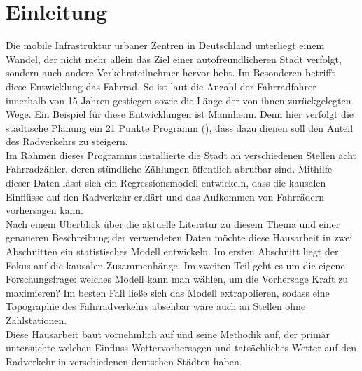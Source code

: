 \documentclass[a4paper,12pt]{thesis}
\begin{document}
\begingroup
\let\clearpage\relax
\listoffigures
\listoftables
\endgroup






\chapter{Einleitung}

Die mobile Infrastruktur urbaner Zentren in Deutschland unterliegt einem Wandel, der nicht mehr allein das Ziel einer autofreundlicheren Stadt verfolgt, sondern auch andere Verkehrsteilnehmer hervor hebt. Im Besonderen betrifft diese Entwicklung das Fahrrad. So ist laut \cite{Nobis2019} die Anzahl der Fahrradfahrer innerhalb von 15 Jahren gestiegen sowie die Länge der von ihnen zurückgelegten Wege. Ein Beispiel für diese Entwicklungen ist Mannheim. Denn hier verfolgt die städtische Planung ein 21 Punkte Programm (\cite{Mannheim2010}), dass dazu dienen soll den Anteil des Radverkehrs zu steigern.\\
Im Rahmen dieses Programms installierte die Stadt an verschiedenen Stellen acht Fahrradzähler, deren stündliche Zählungen öffentlich abrufbar sind. Mithilfe dieser Daten lässt sich ein Regressionsmodell entwickeln, dass die kausalen Einflüsse auf den Radverkehr erklärt und das Aufkommen von Fahrrädern vorhersagen kann.\\
Nach einem Überblick über die aktuelle Literatur zu diesem Thema und einer genaueren Beschreibung der verwendeten Daten möchte diese Hausarbeit in zwei Abschnitten ein statistisches Modell entwickeln. Im ersten Abschnitt liegt der Fokus auf die kausalen Zusammenhänge. Im zweiten Teil geht es um die eigene Forschungsfrage: welches Modell kann man wählen, um die Vorhersage Kraft zu maximieren? Im besten Fall ließe sich das Modell extrapolieren, sodass eine Topographie des Fahrradverkehrs absehbar wäre auch an Stellen ohne Zählstationen.\\
Diese Hausarbeit baut vornehmlich auf \cite{Wessel2020} und seine Methodik auf, der primär untersuchte welchen Einfluss Wettervorhersagen und tatsächliches Wetter auf den Radverkehr in verschiedenen deutschen Städten haben.\\
\end{document}
